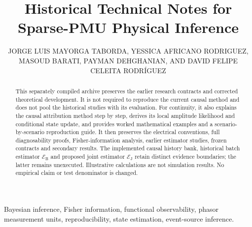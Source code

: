\documentclass{ieeeaccess}
\begin{document}
\history{}
\doi{}
\title{Historical Technical Notes for Sparse-PMU Physical Inference}
\author{\uppercase{Jorge Luis Mayorga Taborda}, \uppercase{Yessica Africano Rodriguez}, \uppercase{Masoud Barati}, \uppercase{Payman Dehghanian}, AND \uppercase{David Felipe Celeita Rodr\'iguez}}
\address[1]{Universidad de los Andes, Bogot\'a, Colombia}
\address[2]{Department of Electrical and Computer Engineering, University of Pittsburgh, Pittsburgh, PA, USA}
\address[3]{Department of Electrical and Computer Engineering, The George Washington University, Washington, DC, USA}
\address[4]{Faculty of Engineering, Universidad de La Sabana, Ch\'ia, Colombia}

\begin{abstract}
This separately compiled archive preserves the earlier research contracts and
corrected theoretical development. It is not required to reproduce the current
causal method and does not pool the historical studies with its evaluation.
For continuity, it also explains the causal attribution method step by step,
derives its local amplitude likelihood and conditional state update, and
provides worked mathematical examples and a scenario-by-scenario reproduction
guide. It then preserves the electrical conventions, full diagnosability
proofs, Fisher-information analysis, earlier estimator studies, frozen
contracts and secondary results. The implemented causal history bank,
historical batch estimator $\mathcal E_{\mathrm B}$ and proposed joint
estimator $\mathcal E_{\mathrm J}$ retain distinct evidence boundaries;
the latter remains unexecuted. Illustrative calculations are not simulation
results. No empirical claim or test denominator is changed.
\end{abstract}
\begin{keywords}
Bayesian inference, Fisher information, functional observability, phasor measurement units, reproducibility, state estimation, event-source inference.
\end{keywords}
\titlepgskip=-21pt
\maketitle
\raggedbottom
\end{document}
